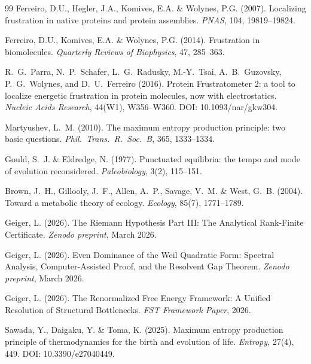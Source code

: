 \documentclass[12pt,a4paper]{article}
\theoremstyle{remark}
\begin{document}
\begin{thebibliography}{99}
Ferreiro, D.U., Hegler, J.A., Komives, E.A. \& Wolynes, P.G. (2007).
\newblock Localizing frustration in native proteins and protein assemblies.
\newblock \textit{PNAS}, 104, 19819--19824.

Ferreiro, D.U., Komives, E.A. \& Wolynes, P.G. (2014).
\newblock Frustration in biomolecules.
\newblock \textit{Quarterly Reviews of Biophysics}, 47, 285--363.

R.~G.~Parra, N.~P.~Schafer, L.~G.~Radusky, M.-Y.~Tsai, A.~B.~Guzovsky, P.~G.~Wolynes, and D.~U.~Ferreiro (2016).
\newblock Protein Frustratometer 2: a tool to localize energetic frustration in protein molecules, now with electrostatics.
\newblock \textit{Nucleic Acids Research}, 44(W1), W356--W360.
\newblock DOI: 10.1093/nar/gkw304.

Martyushev, L.~M. (2010).
\newblock The maximum entropy production principle: two basic questions.
\newblock \textit{Phil.\ Trans.\ R.\ Soc.\ B}, 365, 1333--1334.

Gould, S.~J. \& Eldredge, N. (1977).
\newblock Punctuated equilibria: the tempo and mode of evolution reconsidered.
\newblock \textit{Paleobiology}, 3(2), 115--151.

Brown, J.~H., Gillooly, J.~F., Allen, A.~P., Savage, V.~M. \& West, G.~B. (2004).
\newblock Toward a metabolic theory of ecology.
\newblock \textit{Ecology}, 85(7), 1771--1789.

Geiger, L. (2026).
\newblock The Riemann Hypothesis Part III: The Analytical Rank-Finite Certificate.
\newblock \textit{Zenodo preprint}, March 2026.

Geiger, L. (2026).
\newblock Even Dominance of the Weil Quadratic Form: Spectral Analysis, Computer-Assisted Proof, and the Resolvent Gap Theorem.
\newblock \textit{Zenodo preprint}, March 2026.

Geiger, L. (2026).
\newblock The Renormalized Free Energy Framework: A Unified Resolution of Structural Bottlenecks.
\newblock \textit{FST Framework Paper}, 2026.

Sawada, Y., Daigaku, Y. \& Toma, K. (2025).
\newblock Maximum entropy production principle of thermodynamics for the birth and evolution of life.
\newblock \textit{Entropy}, 27(4), 449.
\newblock DOI: 10.3390/e27040449.


\end{thebibliography}
\end{document}

